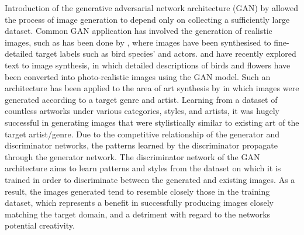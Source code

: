 \documentclass{article}
\begin{document}
Introduction of the generative adversarial network architecture (GAN) by \citet{GAN} allowed the process of image generation to depend only on collecting a sufficiently large dataset.
Common GAN application has involved the generation of realistic images, such as has been done by \citet{bao2017cvae}, where images have been synthesised to fine-detailed target labels such as bird species' and actors.
\citet{zhang2017stackgan} and \citet{reed2016generative} have recently explored text to image synthesis, in which detailed descriptions of birds and flowers have been converted into photo-realistic images using the GAN model.
Such an architecture has been applied to the area of art synthesis by \citet{tan2017artgan} in which images were generated according to a target genre and artist.
Learning from a dataset of countless artworks under various categories, styles, and artists, it was hugely successful in generating images that were stylistically similar to existing art of the target artist/genre.
Due to the competitive relationship of the generator and discriminator networks, the patterns learned by the discriminator propagate through the generator network.
The discriminator network of the GAN architecture aims to learn patterns and styles from the dataset on which it is trained in order to discriminate between the generated and existing images.
As a result, the images generated tend to resemble closely those in the training dataset, which represents a benefit in successfully producing images closely matching the target domain, and a detriment with regard to the networks potential creativity.
\end{document}
